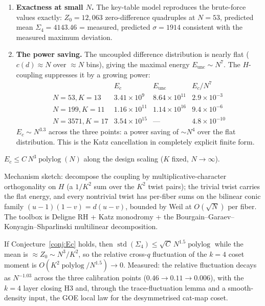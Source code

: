 \begin{enumerate}
\item \textbf{Exactness at small $N$.}  The key-table model reproduces
the brute-force values exactly: $Z_0 = 12{,}063$ zero-difference
quadruples at $N = 53$, predicted mean
$\Sigma_4 = 4143.46$ = measured, predicted $\sigma = 1914$ consistent
with the measured maximum deviation.
\item \textbf{The power saving.}  The uncoupled difference distribution
is nearly flat ($c(d) \approx N$ over $\approx N$ bins), giving the
maximal energy $E_{\mathrm{unc}} \sim N^7$.  The $H$-coupling
suppresses it by a growing power:
\[
\begin{array}{lccc}
 & E_c & E_{\mathrm{unc}} & E_c/N^7\\
N = 53, K = 13 & 3.41 \times 10^9 & 8.64 \times 10^{11} & 2.9 \times 10^{-3}\\
N = 199, K = 11 & 1.16 \times 10^{11} & 1.14 \times 10^{16} & 9.4 \times 10^{-6}\\
N = 3571, K = 17 & 3.54 \times 10^{15} & \text{—} & 4.8 \times 10^{-10}
\end{array}
\]
$E_c \sim N^{3.3}$ across the three points: a power saving of $\sim
N^4$ over the flat distribution.  This is the Katz cancellation in
completely explicit finite form.
\end{enumerate}

\begin{conjecture}
\label{conj:Ec}
$E_c \le C\, N^3 \operatorname{polylog}(N)$ along the design scaling
($K$ fixed, $N \to \infty$).
\end{conjecture}

Mechanism sketch: decompose the coupling by multiplicative-character
orthogonality on $H$ (a $1/K^2$ sum over the $K^2$ twist pairs); the
trivial twist carries the flat energy, and every nontrivial twist has
per-fiber sums on the bilinear conic family
$(u{-}1)(1{-}v) = d(u{-}v)$, bounded by Weil at $O(\sqrt{N})$ per
fiber.  The toolbox is Deligne RH + Katz monodromy + the
Bourgain--Garaev--Konyagin--Shparlinski multilinear decomposition.

\begin{corollary}
If Conjecture~\ref{conj:Ec} holds, then
$\operatorname{std}(\Sigma_4) \le \sqrt{C}\, N^{1.5}
\operatorname{polylog}$ while the mean is $\approx Z_0 \sim N^3/K^2$,
so the relative cross-$q$ fluctuation of the $k{=}4$ coset moment is
$O(K^2 \operatorname{polylog}/N^{1.5}) \to 0$.  Measured: the relative
fluctuation decays as $N^{-1.03}$ across the three calibration points
($0.46 \to 0.11 \to 0.006$), with the $k{=}4$ layer closing H3 and,
through the trace-fluctuation lemma and a smooth-density input, the
GOE local law for the desymmetrised cat-map coset.
\end{corollary}

